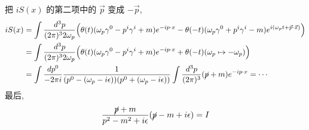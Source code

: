 \begin{itemize}
\begin{tcolorbox}[title=calculation:]
		把 $i S(x)$ 的第二项中的 $\vec{p}$ 变成 $- \vec{p}$,
		\begin{align}
			i S(x) &= \int \frac{d^3 p}{(2 \pi)^3 2 \omega_p} \Big( \theta(t) (\omega_p \gamma^0 - p^i \gamma^i + m) e^{- i p \cdot x} - \theta(- t) (\omega_p \gamma^0 + p^i \gamma^i - m) e^{i (\omega_p t + \vec{p} \cdot \vec{x})} \Big) \notag \\
			&= \int \frac{d^3 p}{(2 \pi)^3 2 \omega_p} \Big( \theta(t) (\omega_p \gamma^0 - p^i \gamma^i + m) e^{- i p \cdot x} + \theta(- t) (\omega_p \mapsto - \omega_p) \Big) \notag \\
			&= \int \frac{dp^0}{- 2 \pi i} \frac{1}{(p^0 - (\omega_p - i \epsilon)) (p^0 + (\omega_p - i \epsilon))} \int \frac{d^3 p}{(2 \pi)^3} (\cancel{p} + m) e^{- i p \cdot x} = \cdots
		\end{align}
		最后,
		\begin{equation}
			\frac{\cancel{p} + m}{p^2 - m^2 + i \epsilon} (\cancel{p} - m + i \epsilon) = I
		\end{equation}
	\end{tcolorbox}
\end{itemize}
